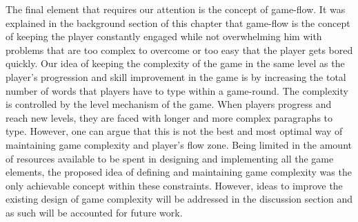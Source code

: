 The final element that requires our attention is the concept of game-flow. It was explained in the background section of this chapter that game-flow is the concept of keeping the player constantly engaged while not overwhelming him with problems that are too complex to overcome or too easy that the player gets bored quickly. Our idea of keeping the complexity of the game in the same level as the player's progression and skill improvement in the game is by increasing the total number of words that players have to type within a game-round. The complexity is controlled by the level mechanism of the game. When players progress and reach new levels, they are faced with longer and more complex paragraphs to type. However, one can argue that this is not the best and most optimal way of maintaining game complexity and player's flow zone. Being limited in the amount of resources available to be spent in designing and implementing all the game elements, the proposed idea of defining and maintaining game complexity was the only achievable concept within these constraints. However, ideas to improve the existing design of game complexity will be addressed in the discussion section and as such will be accounted for future work. 
